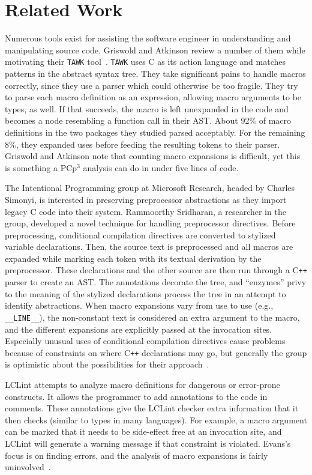 \documentclass{article}
\newcommand{\pcp}{\mbox{\textsf{PCp}$^3$}}
\newcommand{\CPP}{\mbox{C\texttt{++}}}
\newcommand{\C}{\mbox{C}}
\newcommand{\eg}{e.g.,}
\begin{document}
\section{Related Work}
\label{sec:related}
Numerous tools exist for assisting the software engineer in
understanding and manipulating source code.  Griswold and Atkinson
review a number of them while motivating their \texttt{TAWK} tool~\cite{Griswold96}.
\texttt{TAWK} uses \C{} as its action language and matches patterns in
the abstract syntax tree.  They take significant pains to handle macros
correctly, since they use a parser which could otherwise be too
fragile.  They try to parse each macro definition as an expression,
allowing macro arguments to be types, as well.  If that succeeds, the
macro is left unexpanded in the code and becomes a node resembling a
function call in their AST.  About 92\% of macro definitions in the two packages
they studied parsed acceptably.  For the remaining 8\%, they expanded
uses before feeding the resulting tokens to their parser.  Griswold and
Atkinson note that counting macro expansions is difficult, yet this is
something a \pcp{} analysis can do in under five lines of code.

The Intentional Programming group at Microsoft Research, headed by
Charles Simonyi, is interested in preserving preprocessor abstractions
as they import legacy \C{} code into their system.  Rammoorthy
Sridharan, a researcher in the group, developed a novel technique for
handling preprocessor directives. Before preprocessing, conditional
compilation directives are converted to stylized variable declarations.
Then, the source text is preprocessed and all macros are expanded while
marking each token with its textual derivation by the preprocessor.
These declarations and the other source are then run through a \CPP{}
parser to create an AST.  The annotations decorate the tree, and
``enzymes'' privy to the meaning of the
stylized declarations process the tree in an attempt to identify
abstractions.  When macro expansions vary from use to use (\eg{}
\texttt{\_\_LINE\_\_}), the non-constant text is considered an extra argument
to the macro, and the different expansions are explicitly passed at the invocation
sites. Especially unusual uses of conditional compilation directives
cause problems because of constraints on where \CPP{} declarations may
go, but generally the group is optimistic about the possibilities for
their approach~\cite{MSIPPersonal}.

LCLint attempts to analyze macro definitions for dangerous or
error-prone constructs.  It allows the programmer to add annotations to
the code in comments.  These annotations give the LCLint checker extra
information that it then checks (similar to types in many languages).
For example, a macro argument can be marked that it needs to be
side-effect free at an invocation site, and LCLint will generate a
warning message if that constraint is violated.  Evans's focus is on
finding errors, and the analysis of macro expansions is fairly
uninvolved~\cite[Ch.~8]{LCLint}.
\end{document}
